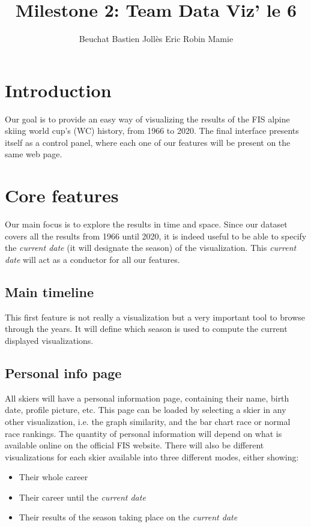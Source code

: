 \documentclass[a4paper,10pt]{article}
\title{
    \textbf{Milestone 2: Team Data Viz' le 6}
}
\author{
    Beuchat Bastien \hspace{2cm} Jollès Eric \hspace{2cm} Robin Mamie
}
\begin{document}
\maketitle

\section*{Introduction}

Our goal is to provide an easy way of visualizing the results of the FIS alpine skiing world cup's (WC) history, from 1966 to 2020.
The final interface presents itself as a control panel, where each one of our features will be present on the same web page.

\section{Core features}

Our main focus is to explore the results in time and space.
Since our dataset covers all the results from 1966 until 2020, it is indeed useful to be able to specify the \textit{current date} (it will designate the season) of the visualization.
This \textit{current date} will act as a conductor for all our features.

\subsection{Main timeline}

This first feature is not really a visualization but a very important tool to browse through the years.
It will define which season is used to compute the current displayed visualizations.

\subsection{Personal info page}

All skiers will have a personal information page, containing their name, birth date, profile picture, etc.
This page can be loaded by selecting a skier in any other visualization, i.e. the graph similarity, and the bar chart race or normal race rankings.
The quantity of personal information will depend on what is available online on the official FIS website.
There will also be different visualizations for each skier available into three different modes, either showing:

\begin{itemize}
\item Their whole career
\item Their career until the \textit{current date}
\item Their results of the season taking place on the \textit{current date}
\end{itemize}
\end{document}
